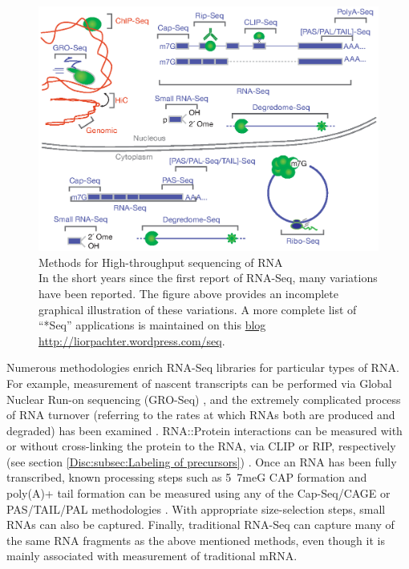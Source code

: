     \begin{figure} %
      \centering 
      \includegraphics{Figures/Intro/RNA_Sequencing_methodologies.eps}
      \caption[Methods for High-throughput sequencing of RNA]
      {
      Methods for High-throughput sequencing of RNA\\[0.25cm]
      In the short years since the first report of RNA-Seq, many variations have been reported. The figure above provides an incomplete graphical illustration of these variations. A more complete list of ``*Seq'' applications is maintained on this \href{http://liorpachter.wordpress.com/seq/}{blog} \url{http://liorpachter.wordpress.com/seq}.
      }
      \label{Intro:fig:htsMethods}
      \end{figure}

    Numerous methodologies enrich RNA-Seq libraries for particular types of RNA. For example, measurement of nascent transcripts can be performed via Global Nuclear Run-on sequencing (GRO-Seq) \citep{Core2008a}, and the extremely complicated process of RNA turnover (referring to the rates at which RNAs both are produced and degraded) has been examined \citep{Ghosh2010a, Tani2012}. RNA::Protein interactions can be measured with or without cross-linking the protein to the RNA, via CLIP or RIP, respectively (see section \ref{Disc:subsec:Labeling of precursors}) \citep{Ule2005,Licatalosi2006,Singh2013}. Once an RNA has been fully transcribed, known processing steps such as 5\textprime~7meG CAP formation and poly(A)+ tail formation can be measured using any of the Cap-Seq/CAGE \citep{Shiraki2003a} or PAS/TAIL/PAL methodologies \citep{Shepard2011, Chang2014b, Subtelny2014}. With appropriate size-selection steps, small RNAs \citep{Ghildiyal2008} can also be captured. Finally, traditional RNA-Seq can capture many of the same RNA fragments as the above mentioned methods, even though it is mainly associated with measurement of traditional mRNA.

